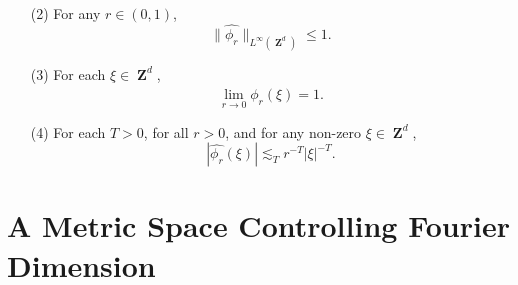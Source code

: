 \documentclass[12pt,reqno]{article}
\numberwithin{equation}{section}
\DeclareMathOperator{\ZZ}{\mathbf{Z}}
\DeclareMathOperator{\TT}{\mathbf{T}}
\numberwithin{theorem}{section}
\begin{document}
\begin{itemize}
\begin{enumerate}
    \item[(2)] For any $r \in (0,1)$,
    \begin{equation} \label{equationDIOJAOIJVIV23242}
        \| \widehat{\phi_r} \|_{L^\infty(\ZZ^d)} \leq 1.
    \end{equation}


    \item[(3)] For each $\xi \in \ZZ^d$,
    \begin{equation} \label{approximationtoidentitypointwiseconvergence}
        \lim_{r \to 0} \widehat{\phi_r}(\xi) = 1.
    \end{equation}

    \item[(4)] For each $T > 0$, for all $r > 0$, and for any non-zero $\xi \in \ZZ^d$,
    \begin{equation} \label{molificationdecaybound}
        |\widehat{\phi_r}(\xi)| \lesssim_T r^{-T} |\xi|^{-T}.
    \end{equation}
\end{enumerate}
\end{itemize}

\section{A Metric Space Controlling Fourier Dimension}
\end{document}
